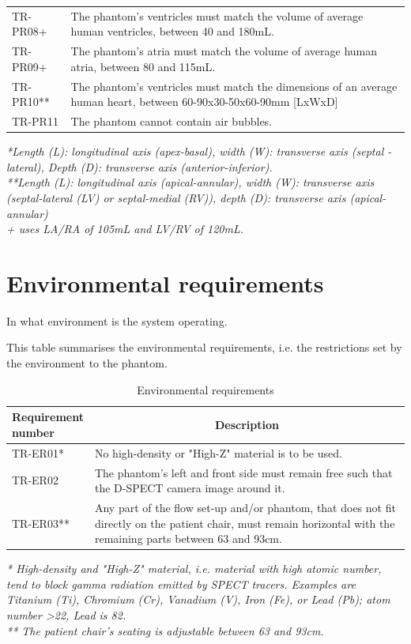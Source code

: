 \begin{table} [H]
\begin{tabular}{l|p{120mm}|}
	TR-PR08+ & The phantom's ventricles must match the volume of average human ventricles, between 40 and 180mL. \\
	TR-PR09+ & The phantom's atria must match the volume of average human atria, between 80 and 115mL. \\
	TR-PR10** & The phantom's ventricles must match the dimensions of an average human heart, between 60-90x30-50x60-90mm [LxWxD] \\
	TR-PR11 & The phantom cannot contain air bubbles. \\
	\cline{2-2}
\end{tabular}
\raggedright
\textit{*Length (L): longitudinal axis (apex-basal), width (W): transverse axis (septal - lateral), Depth (D):  transverse axis (anterior-inferior).} \\
\textit{**Length (L): longitudinal axis (apical-annular), width (W): transverse axis (septal-lateral (LV) or septal-medial (RV)), depth (D): transverse axis (apical-annular)} \\
\textit{+\cite{chiribiri2013perfusion} uses LA/RA of 105mL and LV/RV of 120mL.}
\end{table}

\section{Environmental requirements}
In what environment is the system operating.
\begin{table} [H]
\caption{Environmental requirements}
\label{tab:envirreq}
This table summarises the environmental requirements, i.e. the restrictions set by the environment to the phantom.
\begin{tabular}{l|p{120mm}|}
	\makecell[l]{\textbf{Requirement} \\ \textbf{number}} & \multicolumn{1}{c}{\textbf{Description}}\\
	\hline
	TR-ER01* &  No high-density or "High-Z" material is to be used.\\ 
	TR-ER02 & The phantom's left and front side must remain free such that the D-SPECT camera image around it. \\ 
	TR-ER03** & Any part of the flow set-up and/or phantom, that does not fit directly on the patient chair, must remain horizontal with the remaining parts between 63 and 93cm. \\
	\cline{2-2}
\end{tabular}
\raggedright
\textit{* High-density and "High-Z" material, i.e. material with high atomic number, tend to block gamma radiation emitted by \ac{SPECT} tracers. Examples are Titanium (Ti), Chromium (Cr), Vanadium (V), Iron (Fe), or Lead (Pb); atom number \textgreater 22, Lead is 82.} \\
\textit{** The patient chair's seating is adjustable between 63 and 93cm.}
\end{table}

